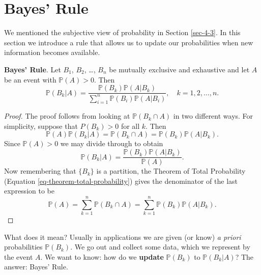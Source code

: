 \documentclass[captions=tableheading]{scrbook}
\begin{document}
\section{Bayes' Rule}
\label{sec-4-8}
\label{sec-Bayes'-Rule}


We mentioned the subjective view of probability in Section \ref{sec-4-3}. In this section we introduce a rule that allows us to update our probabilities when new information becomes available. 

\begin{thm}
\textbf{Bayes' Rule}. Let \(B_{1}\), \(B_{2}\), \ldots{}, \(B_{n}\) be mutually exclusive and exhaustive and let \(A\) be an event with \(\mathbb{P}(A)>0\). Then 
\begin{equation}
\mathbb{P}(B_{k}|A)=\frac{\mathbb{P}(B_{k})\mathbb{P}(A|B_{k})}{\sum_{i=1}^{n}\mathbb{P}(B_{i})\mathbb{P}(A|B_{i})},\quad k=1,2,\ldots,n.\label{eq-bayes-rule}
\end{equation}
\end{thm}

\begin{proof}
The proof follows from looking at \(\mathbb{P}(B_{k}\cap A)\) in two different ways. For simplicity, suppose that \(P(B_{k})>0\) for all \(k\). Then
\[
\mathbb{P}(A)\mathbb{P}(B_{k}|A)=\mathbb{P}(B_{k}\cap A)=\mathbb{P}(B_{k})\mathbb{P}(A|B_{k}).
\]
Since \(\mathbb{P}(A)>0\) we may divide through to obtain 
\[
\mathbb{P}(B_{k}|A)=\frac{\mathbb{P}(B_{k})\mathbb{P}(A|B_{k})}{\mathbb{P}(A)}.
\]
Now remembering that \(\{ B_{k} \}\) is a partition, the Theorem of Total Probability (Equation \ref{eq-theorem-total-probability}) gives the denominator of the last expression to be
\[
\mathbb{P}(A)=\sum_{k=1}^{n}\mathbb{P}(B_{k}\cap A)=\sum_{k=1}^{n}\mathbb{P}(B_{k})\mathbb{P}(A|B_{k}).
\]
\end{proof}

What does it mean? Usually in applications we are given (or know) \emph{a priori} probabilities \(\mathbb{P}(B_{k})\). We go out and collect some data, which we represent by the event \(A\). We want to know: how do we \textbf{update} \(\mathbb{P}(B_{k})\) to \(\mathbb{P}(B_{k}|A)\)? The answer: Bayes' Rule.
\end{document}
